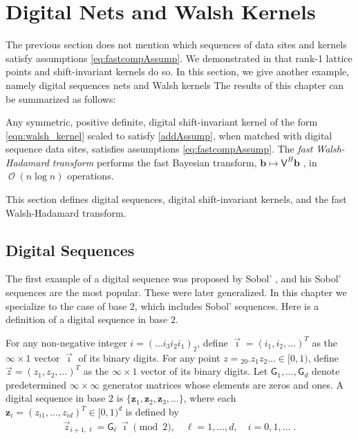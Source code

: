 \documentclass[graybox,footinfo]{svmult}
\DeclareMathOperator{\Order}{{\mathcal O}}
\newcommand{\bm}[1]{\boldsymbol{#1}}
\newcommand{\vb}{\bm{b}}
\newcommand{\vz}{\bm{z}}
\newcommand{\ai}{\overrightarrow{\imath}}
\newcommand{\az}{\overrightarrow{z}}
\newcommand{\mV}{\mathsf{V}}
\begin{document}



\section{Digital Nets and Walsh Kernels}
\label{sec:sobol_walsh}


The previous section does not mention which sequences of data sites and  kernels satisfy assumptions \eqref{eq:fastcompAssump}.  We demonstrated in \cite{RatHic19a} that rank-1 lattice points and shift-invariant kernels do so.  In this section, we give another example, namely 
digital sequences nets and Walsh kernels
The results of this chapter can be summarized as follows:



\begin{theorem}
	Any symmetric, positive definite, digital shift-invariant kernel of the form \eqref{eqn:walsh_kernel} scaled to satisfy \eqref{addAssump}, when matched with digital sequence data sites, satisfies assumptions \eqref{eq:fastcompAssump}.  The \emph{fast Walsh-Hadamard transform} performs the fast Bayesian transform,  $\vb \mapsto \mV^H \vb$ , in $\Order(n \log n)$ operations.
\end{theorem}
This section defines digital sequences, digital shift-invariant kernels, and the fast Walsh-Hadamard transform.

\subsection{Digital Sequences} \label{sec:sobol}

The first example of a digital sequence was proposed by Sobol' \cite{Sob67}, and his Sobol' sequences are the most popular.  These were later generalized.  In this chapter we specialize to the case of base $2$, which includes Sobol' sequences.  Here is a definition of a digital sequence in base $2$.

\begin{definition} \label{def:digitalseq}
	For any non-negative integer $i = (\dots i_3 i_2 i_1)_2$, define $\ai = (i_1, i_2, \dots)^T$ as the $\infty \times 1$ vector $\ai$ of its binary digits. 
	For any point $z = {}_20.z_1 z_2 \dots \in [0, 1)$, define $\az = (z_1, z_2, \dots)^T$ as the $\infty \times 1$ vector of its binary digits. 
	Let $ \mathsf{G}_1, \dots , \mathsf{G}_d$ denote predetermined $\infty \times \infty$ generator matrices whose elements are zeros and ones. 
	A digital sequence in base $2$ is $\{\vz_1, \vz_2, \vz_3, \dots\}$, where each $\vz_i = ( z_{i1}, \dots , z_{id})^T \in [0, 1)^d$ is defined by
	\begin{align*}
	\az_{i+1,\ell} = \mathsf{G}_{\ell} \, \ai \pmod 2,  \quad \ell = 1, \dots, d, \quad i = 0, 1, \dots \;.
	\end{align*}
\end{definition}
\end{document}
